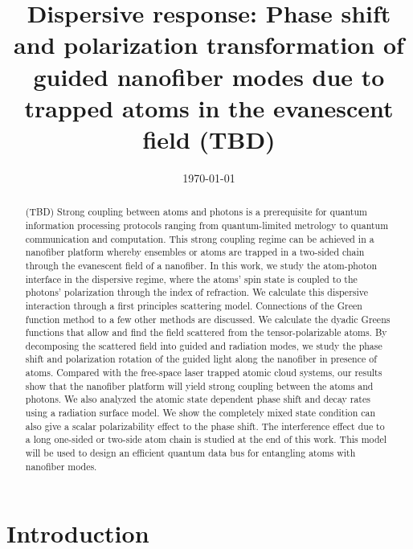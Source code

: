\documentclass[preprint,aps,pra,onecolumn]{revtex4-1} %
\begin{document}
\title{Dispersive response: Phase shift and polarization transformation of guided nanofiber modes due 
to trapped atoms in the evanescent field (TBD)}
\author{}
\date{\today}

\begin{abstract}
(TBD) Strong coupling between atoms and photons is a prerequisite for quantum information processing protocols ranging from quantum-limited metrology to quantum communication and computation.  This strong coupling regime can be achieved in a nanofiber platform whereby ensembles or atoms are trapped in a two-sided chain through the evanescent field of a nanofiber.  In this work, we study the atom-photon interface in the dispersive regime, where the atoms' spin state is coupled to the photons' polarization through the index of refraction. We calculate this dispersive interaction through a first principles scattering model. Connections of the Green function method to a few other methods are discussed.  We calculate the dyadic Greens functions that allow and find the field scattered from the tensor-polarizable atoms. By decomposing the scattered field into guided and radiation modes, we study the phase shift and polarization rotation of the guided light along the nanofiber in presence of atoms. Compared with the free-space laser trapped atomic cloud systems, our results show that the nanofiber platform will yield strong coupling between the atoms and photons. We also analyzed the atomic state dependent phase shift and decay rates using a radiation surface model. We show the completely mixed state condition can also give a scalar polarizability effect to the phase shift. The interference effect due to a long one-sided or two-side atom chain is studied at the end of this work. This model will be used to design an efficient quantum data bus for entangling atoms with nanofiber modes.   
\end{abstract}

\maketitle

\section{Introduction}
\end{document}
